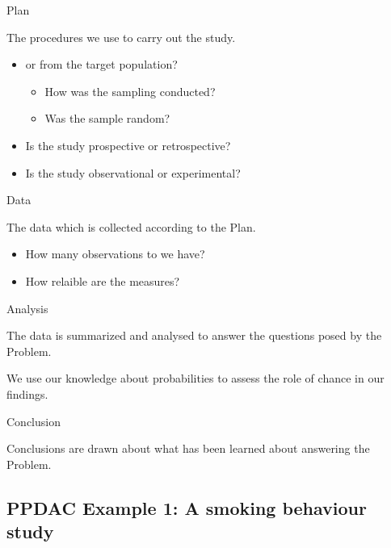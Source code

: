 \documentclass[ignorenonframetext,aspectratio=169]{beamer}
\providecommand{\tightlist}{%
  \setlength{\itemsep}{0pt}\setlength{\parskip}{0pt}}
\renewcommand{\textbf}{\structure}
\begin{document}
\begin{frame}{Plan}

The procedures we use to carry out the study.

\begin{itemize}
\tightlist
\item
  \textbf{Census} or \textbf{sample} from the target population?

  \begin{itemize}
  \tightlist
  \item
    How was the sampling conducted?
  \item
    Was the sample random?
  \end{itemize}
\item
  Is the study prospective or retrospective?
\item
  Is the study observational or experimental?
\end{itemize}

\end{frame}

\begin{frame}{Data}

The data which is collected according to the Plan.

\begin{itemize}
\tightlist
\item
  How many observations to we have?
\item
  How relaible are the measures?
\end{itemize}

\end{frame}

\begin{frame}{Analysis}

The data is summarized and analysed to answer the questions posed by the
Problem.

We use our knowledge about probabilities to assess the role of chance in
our findings.

\end{frame}

\begin{frame}{Conclusion}

Conclusions are drawn about what has been learned about answering the
Problem.

\end{frame}

\subsection{PPDAC Example 1: A smoking behaviour
study}\label{ppdac-example-1-a-smoking-behaviour-study}
\end{document}

